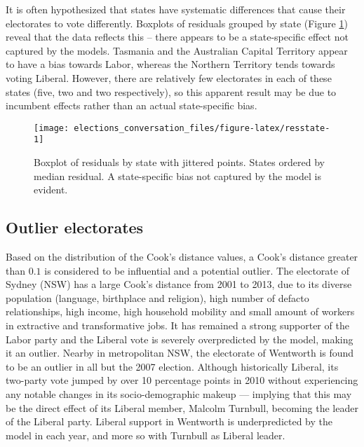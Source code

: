 \documentclass[11pt,a4paper,]{article}
\begin{document}
It is often hypothesized that states have systematic differences that cause their electorates to vote differently. Boxplots of residuals grouped by state (Figure \ref{fig:resstate}) reveal that the data reflects this -- there appears to be a state-specific effect not captured by the models. Tasmania and the Australian Capital Territory appear to have a bias towards Labor, whereas the Northern Territory tends towards voting Liberal. However, there are relatively few electorates in each of these states (five, two and two respectively), so this apparent result may be due to incumbent effects rather than an actual state-specific bias.

\begin{figure}[h]

{\centering \texttt{[image: elections\_conversation\_files/figure-latex/resstate-1]} 

}

\caption{Boxplot of residuals by state with jittered points. States ordered by median residual. A state-specific bias not captured by the model is evident.}\label{fig:resstate}
\end{figure}

\hypertarget{outlier-electorates}{%
\subsection{Outlier electorates}\label{outlier-electorates}}

Based on the distribution of the Cook's distance values, a Cook's distance greater than \(0.1\) is considered to be influential and a potential outlier. The electorate of Sydney (NSW) has a large Cook's distance from 2001 to 2013, due to its diverse population (language, birthplace and religion), high number of defacto relationships, high income, high household mobility and small amount of workers in extractive and transformative jobs. It has remained a strong supporter of the Labor party and the Liberal vote is severely overpredicted by the model, making it an outlier. Nearby in metropolitan NSW, the electorate of Wentworth is found to be an outlier in all but the 2007 election. Although historically Liberal, its two-party vote jumped by over 10 percentage points in 2010 without experiencing any notable changes in its socio-demographic makeup --- implying that this may be the direct effect of its Liberal member, Malcolm Turnbull, becoming the leader of the Liberal party. Liberal support in Wentworth is underpredicted by the model in each year, and more so with Turnbull as Liberal leader.
\end{document}
